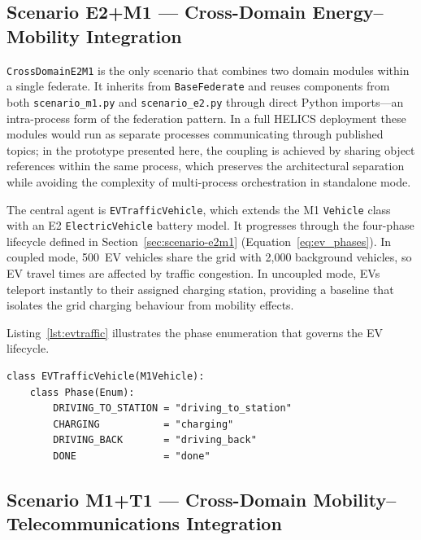 \subsection{Scenario E2+M1 --- Cross-Domain Energy--Mobility Integration}

\texttt{CrossDomainE2M1} is the only scenario that combines two domain modules within a single federate. It inherits from \texttt{BaseFederate} and reuses components from both \texttt{scenario\_m1.py} and \texttt{scenario\_e2.py} through direct Python imports---an intra-process form of the federation pattern. In a full HELICS deployment these modules would run as separate processes communicating through published topics; in the prototype presented here, the coupling is achieved by sharing object references within the same process, which preserves the architectural separation while avoiding the complexity of multi-process orchestration in standalone mode.

The central agent is \texttt{EVTrafficVehicle}, which extends the M1 \texttt{Vehicle} class with an E2 \texttt{ElectricVehicle} battery model. It progresses through the four-phase lifecycle defined in Section~\ref{sec:scenario-e2m1} (Equation~\ref{eq:ev_phases}). In coupled mode, 500~EV vehicles share the grid with 2{,}000 background vehicles, so EV travel times are affected by traffic congestion. In uncoupled mode, EVs teleport instantly to their assigned charging station, providing a baseline that isolates the grid charging behaviour from mobility effects.

Listing~\ref{lst:evtraffic} illustrates the phase enumeration that governs the EV lifecycle.

\begin{listing}[h]
\begin{verbatim}
class EVTrafficVehicle(M1Vehicle):
    class Phase(Enum):
        DRIVING_TO_STATION = "driving_to_station"
        CHARGING           = "charging"
        DRIVING_BACK       = "driving_back"
        DONE               = "done"
\end{verbatim}
\caption{Phase enumeration of the \texttt{EVTrafficVehicle} cross-domain agent (scenario\_e2m1.py)}
\label{lst:evtraffic}
\end{listing}

\subsection{Scenario M1+T1 --- Cross-Domain Mobility--Telecommunications Integration}


